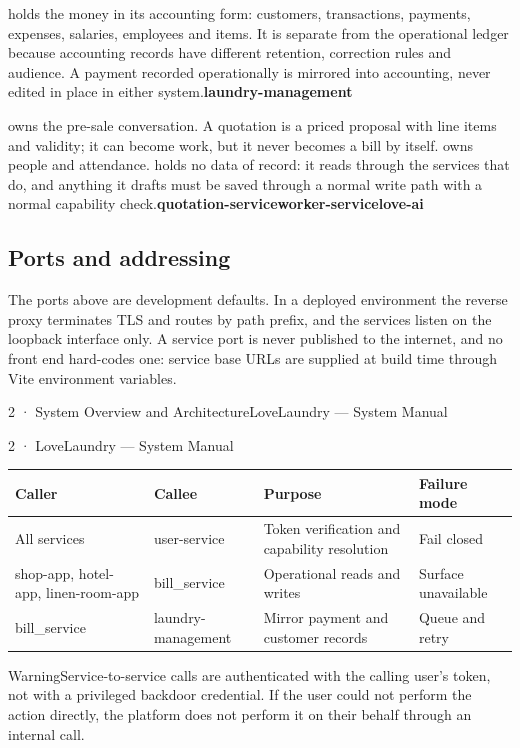 \documentclass[11pt,a4paper,oneside]{book}
\begin{document}
holds the money in its accounting form: customers, transactions, payments, expenses, salaries, employees and items. It is separate from the operational ledger because accounting records have different retention, correction rules and audience. A payment recorded operationally is mirrored into accounting, never edited in place in either system.\textbf{laundry-management}

owns the pre-sale conversation. A quotation is a priced proposal with line items and validity; it can become work, but it never becomes a bill by itself.  owns people and attendance.  holds no data of record: it reads through the services that do, and anything it drafts must be saved through a normal write path with a normal capability check.\textbf{quotation-service}\textbf{worker-service}\textbf{love-ai}

\subsection*{Ports and addressing}
The ports above are development defaults. In a deployed environment the reverse proxy terminates TLS and routes by path prefix, and the services listen on the loopback interface only. A service port is never published to the internet, and no front end hard-codes one: service base URLs are supplied at build time through Vite environment variables.

2 · System Overview and ArchitectureLoveLaundry — System Manual

2 · LoveLaundry — System Manual

\begin{center}\small
\begin{tabularx}{\linewidth}{|X|X|X|X|}
\hline
\rowcolor{lightgrey}
\textbf{Caller} & \textbf{Callee} & \textbf{Purpose} & \textbf{Failure mode} \\ \hline
All services & user-service & Token verification and capability resolution & Fail closed \\ \hline
shop-app, hotel-app, linen-room-app & bill\_service & Operational reads and writes & Surface unavailable \\ \hline
bill\_service & laundry-management & Mirror payment and customer records & Queue and retry \\ \hline
\end{tabularx}
\end{center}
\begin{notebox}WarningService-to-service calls are authenticated with the calling user's token, not with a privileged backdoor credential. If the user could not perform the action directly, the platform does not perform it on their behalf through an internal call.\end{notebox}
\end{document}
